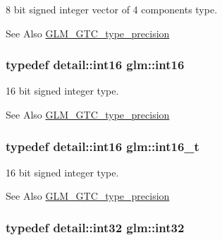 8 bit signed integer vector of 4 components type. \begin{DoxySeeAlso}{See Also}
\hyperlink{group__gtc__type__precision}{G\-L\-M\-\_\-\-G\-T\-C\-\_\-type\-\_\-precision} 
\end{DoxySeeAlso}
\hypertarget{group__gtc__type__precision_ga2945a61d12771f8954994fcddf02b021}{
\subsubsection[{int16}]{\setlength{\rightskip}{0pt plus 5cm}typedef detail\-::int16 {\bf glm\-::int16}}}\label{group__gtc__type__precision_ga2945a61d12771f8954994fcddf02b021}
16 bit signed integer type. \begin{DoxySeeAlso}{See Also}
\hyperlink{group__gtc__type__precision}{G\-L\-M\-\_\-\-G\-T\-C\-\_\-type\-\_\-precision} 
\end{DoxySeeAlso}
\hypertarget{group__gtc__type__precision_gaf89ee61e0d34aa4a462104b7ae7f2da6}{
\subsubsection[{int16\-\_\-t}]{\setlength{\rightskip}{0pt plus 5cm}typedef detail\-::int16 {\bf glm\-::int16\-\_\-t}}}\label{group__gtc__type__precision_gaf89ee61e0d34aa4a462104b7ae7f2da6}
16 bit signed integer type. \begin{DoxySeeAlso}{See Also}
\hyperlink{group__gtc__type__precision}{G\-L\-M\-\_\-\-G\-T\-C\-\_\-type\-\_\-precision} 
\end{DoxySeeAlso}
\hypertarget{group__gtc__type__precision_ga632d8b25f6b61659f39ea4321fab92a4}{
\subsubsection[{int32}]{\setlength{\rightskip}{0pt plus 5cm}typedef detail\-::int32 {\bf glm\-::int32}}}\label{group__gtc__type__precision_ga632d8b25f6b61659f39ea4321fab92a4}
